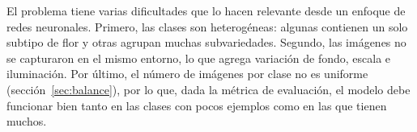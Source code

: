 El problema tiene varias dificultades que lo hacen relevante desde un enfoque de redes neuronales. Primero, las clases son heterogéneas: algunas contienen un solo subtipo de flor y otras agrupan muchas subvariedades. Segundo, las imágenes no se capturaron en el mismo entorno, lo que agrega variación de fondo, escala e iluminación. Por último, el número de imágenes por clase no es uniforme (sección~\ref{sec:balance}), por lo que, dada la métrica de evaluación, el modelo debe funcionar bien tanto en las clases con pocos ejemplos como en las que tienen muchos.

